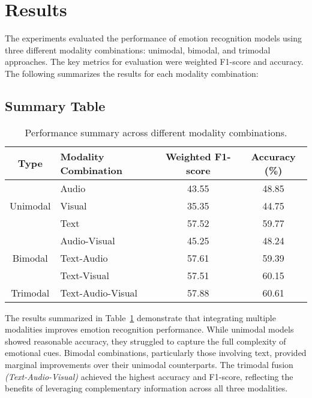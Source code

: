 \section{Results}
The experiments evaluated the performance of emotion recognition models using three different modality combinations: unimodal, bimodal, and trimodal approaches. The key metrics for evaluation were weighted F1-score and accuracy. The following summarizes the results for each modality combination:

\subsection{Summary Table}
\begin{table}[h!]
\centering
\begin{tabular}{|c|l|c|c|}
\hline
\textbf{Type} & \textbf{Modality Combination} & \textbf{Weighted F1-score} & \textbf{Accuracy (\%)} \\ \hline
\multirow{3}{*}{Unimodal} & Audio                         & 43.55             & 48.85                 \\ \cline{2-4}
                          & Visual                        & 35.35             & 44.75                 \\ \cline{2-4}
                          & Text                          & 57.52             & 59.77                 \\ \hline
\multirow{3}{*}{Bimodal}  & Audio-Visual                  & 45.25             & 48.24                 \\ \cline{2-4}
                          & Text-Audio                    & 57.61             & 59.39                 \\ \cline{2-4}
                          & Text-Visual                   & 57.51             & 60.15                 \\ \hline
Trimodal                  & Text-Audio-Visual             & 57.88             & 60.61                 \\ \hline
\end{tabular}
\caption{Performance summary across different modality combinations.}
\label{tab:results}
\end{table}

The results summarized in Table~\ref{tab:results} demonstrate that integrating multiple modalities improves emotion recognition performance. While unimodal models showed reasonable accuracy, they struggled to capture the full complexity of emotional cues. Bimodal combinations, particularly those involving text, provided marginal improvements over their unimodal counterparts. The trimodal fusion \emph{(Text-Audio-Visual)} achieved the highest accuracy and F1-score, reflecting the benefits of leveraging complementary information across all three modalities.

